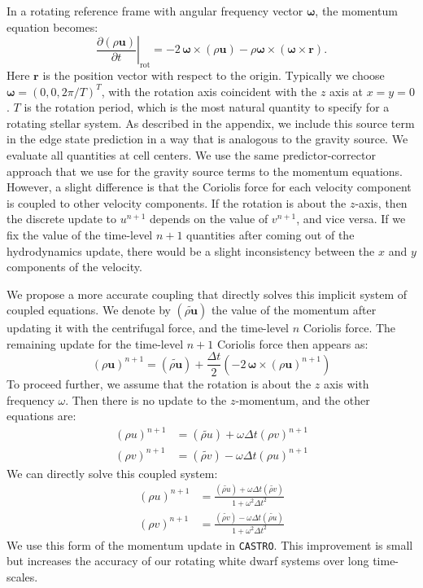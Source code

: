\documentclass[iop]{../emulateapj}
\newcommand{\castro}{\texttt{CASTRO}}
\begin{document}
In a rotating reference frame with angular frequency vector $\bm{\omega}$, the momentum equation becomes:
\begin{equation}
  \left.\frac{\partial(\rho \mathbf{u})}{\partial t}\right|_{\text{rot}} = -2\, {\bm\omega} \times (\rho\mathbf{u}) - \rho {\bm\omega} \times \left({\bm\omega} \times \mathbf{r}\right).
\end{equation}
Here $\mathbf{r}$ is the position vector with respect to the origin. Typically we choose $\bm{\omega} = (0, 0, 2\pi / T)^T$,
with the rotation axis coincident with the $z$ axis at $x = y = 0$.
$T$ is the rotation period, which is the most natural quantity to specify
for a rotating stellar system. As described in the appendix, we include this source term
in the edge state prediction in a way that is analogous to the gravity source.
We evaluate all quantities at cell centers. We use the same predictor-corrector 
approach that we use for the gravity source terms to the momentum equations. However, a slight 
difference is that the Coriolis force for each velocity component is coupled to other velocity 
components. If the rotation is about the $z$-axis, then the discrete update to 
$u^{n+1}$ depends on the value of $v^{n+1}$, and vice versa. If we fix the value of 
the time-level $n+1$ quantities after coming out of the hydrodynamics update, there 
would be a slight inconsistency between the $x$ and $y$ components of the velocity. 

We propose a more accurate coupling that directly solves this implicit system of coupled 
equations. We denote by $(\widetilde{\rho \mathbf{u}})$ the value of the momentum after 
updating it with the centrifugal force, and the time-level $n$ Coriolis force. The remaining 
update for the time-level $n+1$ Coriolis force then appears as:
\begin{equation}
  (\rho \mathbf{u})^{n+1} = (\widetilde{\rho\mathbf{u}}) + \frac{\Delta t}{2} \left(-2\, {\bm\omega} \times (\rho\mathbf{u})^{n+1}\right)
\end{equation}
To proceed further, we assume that the rotation is about the $z$ axis with frequency $\omega$. 
Then there is no update to the $z$-momentum, and the other equations are:
\begin{align}
  (\rho u)^{n+1} &= (\widetilde{\rho u}) + \omega \Delta t (\rho v)^{n+1} \\
  (\rho v)^{n+1} &= (\widetilde{\rho v}) - \omega \Delta t (\rho u)^{n+1}
\end{align} 
We can directly solve this coupled system:
\begin{align}
  (\rho u)^{n+1} &= \frac{ (\widetilde{\rho u}) + \omega \Delta t (\widetilde{\rho v})}{1 + \omega^2 \Delta t^2} \\
  (\rho v)^{n+1} &= \frac{ (\widetilde{\rho v}) - \omega \Delta t (\widetilde{\rho u})}{1 + \omega^2 \Delta t^2}
\end{align}
We use this form of the momentum update in \castro. This improvement is small
but increases the accuracy of our rotating white dwarf systems over long time-scales.
\end{document}
